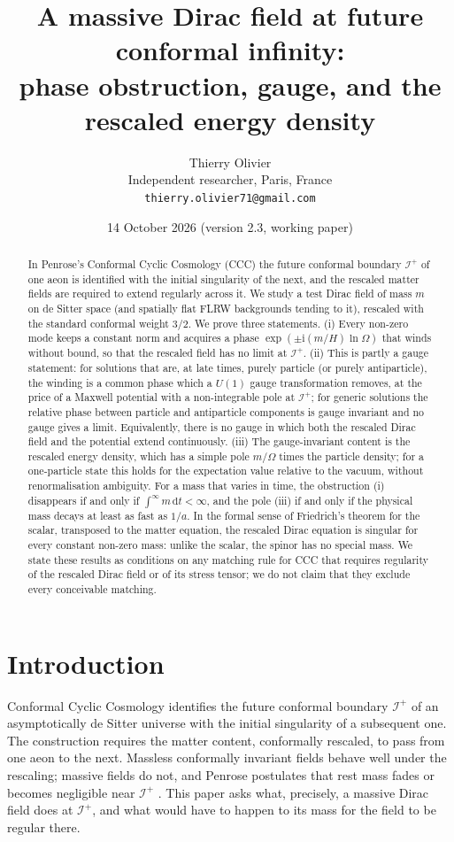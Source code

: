 \documentclass[11pt,a4paper]{article}
\title{\textbf{A massive Dirac field at future conformal infinity:\\ phase obstruction, gauge, and the rescaled energy density}}
\author{Thierry Olivier\\ \small Independent researcher, Paris, France\\ \small \texttt{thierry.olivier71@gmail.com}}
\date{14 October 2026 \quad (version 2.3, working paper)}
\theoremstyle{definition}
\newcommand{\scri}{\mathscr{I}^{+}}
\newcommand{\dd}{\mathrm{d}}
\newcommand{\ii}{\mathrm{i}}
\begin{document}
\maketitle

\begin{abstract}
In Penrose's Conformal Cyclic Cosmology (CCC) the future conformal boundary $\scri$ of one aeon is identified with the initial singularity of the next, and the rescaled matter fields are required to extend regularly across it. We study a test Dirac field of mass $m$ on de Sitter space (and spatially flat FLRW backgrounds tending to it), rescaled with the standard conformal weight $3/2$. We prove three statements. (i) Every non-zero mode keeps a constant norm and acquires a phase $\exp(\pm\ii(m/H)\ln\Omega)$ that winds without bound, so that the rescaled field has no limit at $\scri$. (ii) This is partly a gauge statement: for solutions that are, at late times, purely particle (or purely antiparticle), the winding is a common phase which a $U(1)$ gauge transformation removes, at the price of a Maxwell potential with a non-integrable pole at $\scri$; for generic solutions the relative phase between particle and antiparticle components is gauge invariant and no gauge gives a limit. Equivalently, there is no gauge in which both the rescaled Dirac field and the potential extend continuously. (iii) The gauge-invariant content is the rescaled energy density, which has a simple pole $m/\Omega$ times the particle density; for a one-particle state this holds for the expectation value relative to the vacuum, without renormalisation ambiguity. For a mass that varies in time, the obstruction (i) disappears if and only if $\int^\infty m\,\dd t<\infty$, and the pole (iii) if and only if the physical mass decays at least as fast as $1/a$. In the formal sense of Friedrich's theorem for the scalar, transposed to the matter equation, the rescaled Dirac equation is singular for every constant non-zero mass: unlike the scalar, the spinor has no special mass. We state these results as conditions on any matching rule for CCC that requires regularity of the rescaled Dirac field or of its stress tensor; we do not claim that they exclude every conceivable matching.
\end{abstract}

\section{Introduction}

Conformal Cyclic Cosmology \cite{Penrose2010,Tod2013,MeissnerPenrose2025} identifies the future conformal boundary $\scri$ of an asymptotically de Sitter universe with the initial singularity of a subsequent one. The construction requires the matter content, conformally rescaled, to pass from one aeon to the next. Massless conformally invariant fields behave well under the rescaling; massive fields do not, and Penrose postulates that rest mass fades or becomes negligible near $\scri$ \cite{Penrose2010}. This paper asks what, precisely, a massive Dirac field does at $\scri$, and what would have to happen to its mass for the field to be regular there.
\end{document}
